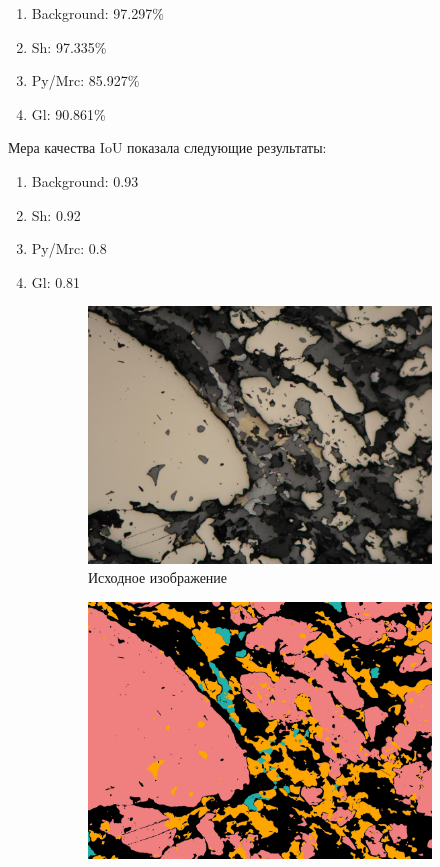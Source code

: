 \begin{enumerate}[nosep]
    \item Background: 97.297\%
    \item Sh: 97.335\%
    \item Py/Mrc: 85.927\%
    \item Gl: 90.861\%
\end{enumerate}{}
Мера качества IoU показала следующие результаты:
\begin{enumerate}[nosep]
    \item Background: 0.93
    \item Sh: 0.92
    \item Py/Mrc: 0.8
    \item Gl: 0.81
\end{enumerate}{}

\begin{figure}[H]
\begin{subfigure}{.33\textwidth}
  \centering
  \includegraphics[width=.9\linewidth]{pics/image_7_src.jpg}
  \caption{Исходное изображение}
  \label{fig:sfig2_1}
\end{subfigure}%
\begin{subfigure}{.33\textwidth}
  \centering
  \includegraphics[width=.9\linewidth]{pics/image_7_gt.jpg}

\end{subfigure}
\end{figure}
